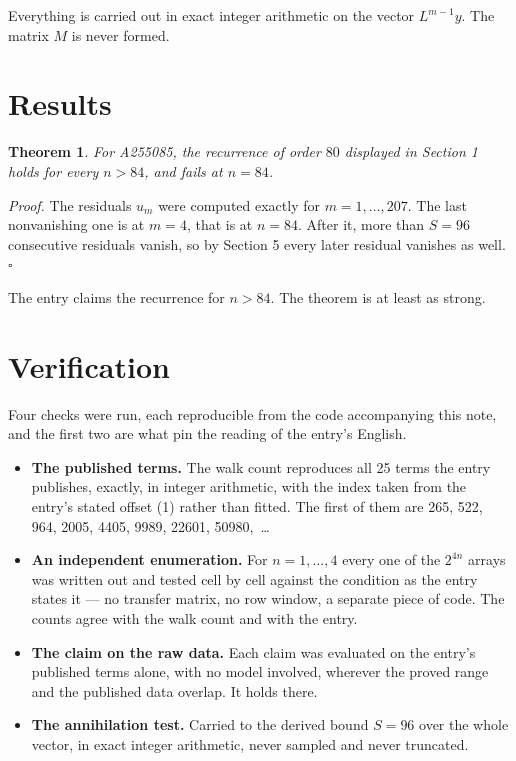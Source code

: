 \documentclass[11pt]{article}
\newtheorem{theorem}{Theorem}
\theoremstyle{definition}
\begin{document}
Everything is carried out in exact integer arithmetic on the vector $L^{m-1}y$. The matrix $M$ is never formed.

\section{Results}

\begin{theorem} For A255085, the recurrence of order $80$ displayed in Section 1 holds for every $n > 84$, and fails at $n = 84$.\end{theorem}

{\itshape Proof.} The residuals $u_m$ were computed exactly for $m = 1,\dots,207$. The last nonvanishing one is at $m = 4$, that is at $n = 84$. After it, more than $S = 96$ consecutive residuals vanish, so by Section 5 every later residual vanishes as well. $\square$

The entry claims the recurrence for $n > 84$. The theorem is at least as strong.

\section{Verification}

Four checks were run, each reproducible from the code accompanying this note, and the first two are what pin the reading of the entry's English.

\begin{itemize}

\item {\bfseries The published terms.} The walk count reproduces all 25 terms the entry publishes, exactly, in integer arithmetic, with the index taken from the entry's stated offset (1) rather than fitted. The first of them are 265, 522, 964, 2005, 4405, 9989, 22601, 50980,~\dots

\item {\bfseries An independent enumeration.} For $n = 1,\dots,4$ every one of the $2^{4n}$ arrays was written out and tested cell by cell against the condition as the entry states it --- no transfer matrix, no row window, a separate piece of code. The counts agree with the walk count and with the entry.

\item {\bfseries The claim on the raw data.} Each claim was evaluated on the entry's published terms alone, with no model involved, wherever the proved range and the published data overlap. It holds there.

\item {\bfseries The annihilation test.} Carried to the derived bound $S = 96$ over the whole vector, in exact integer arithmetic, never sampled and never truncated.

\end{itemize}
\end{document}
